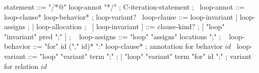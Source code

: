 \begin{syntax}
  statement ::= "/*@" loop-annot "*/" ;
  C-iteration-statement ;
  \
  loop-annot ::= loop-clause* { loop-behavior* } ;
                 loop-variant? 
  \
  loop-clause ::= loop-invariant | { loop-assigns } ;
                | { loop-allocation } ;
  \
  [ loop-invariant ] ::= { clause-kind? } ;
                         [ "loop" "invariant" pred ";" ] ;
  \
  { loop-assigns } ::= { "loop" "assigns" locations ";" } ;
  \
  { loop-behavior } ::= { "for" id ("," id)* ":" loop-clause* } ; annotation for behavior $id$
  \
  loop-variant ::= "loop" "variant" term ";" ;
  | "loop" "variant" term "for" id ";" ;  variant for relation $id$
\end{syntax}
